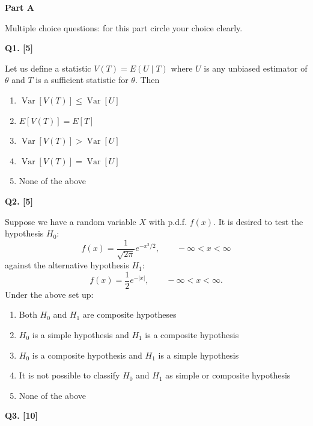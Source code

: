 \documentclass[11pt]{article}
\begin{document}
\vspace{1em}

\begin{center}
\textbf{Part A}
\end{center}

\begingroup
\small
\setlength{\parskip}{0.1em}
Multiple choice questions: for this part circle your choice clearly.

\medskip
\textbf{Q1. [5]}

Let us define a statistic $V(T)=E(U\mid T)$ where $U$ is any unbiased estimator of $\theta$ and $T$ is a sufficient statistic for $\theta$. Then
\begin{enumerate}
\setlength{\itemsep}{0pt}\setlength{\parsep}{0pt}\setlength{\topsep}{2pt}
\item[(a)] $\operatorname{Var}[V(T)]\leq\operatorname{Var}[U]$
\item[(b)] $E[V(T)]=E[T]$
\item[(c)] $\operatorname{Var}[V(T)]>\operatorname{Var}[U]$
\item[(d)] $\operatorname{Var}[V(T)]=\operatorname{Var}[U]$
\item[(e)] None of the above
\end{enumerate}

\medskip
\textbf{Q2. [5]}

Suppose we have a random variable $X$ with p.d.f. $f(x)$. It is desired to test the hypothesis $H_0$:
\[
f(x)=\frac{1}{\sqrt{2\pi}}e^{-x^2/2},\qquad -\infty<x<\infty
\]
against the alternative hypothesis $H_1$:
\[
f(x)=\frac{1}{2}e^{-|x|},\qquad -\infty<x<\infty.
\]
Under the above set up:
\begin{enumerate}
\setlength{\itemsep}{0pt}\setlength{\parsep}{0pt}\setlength{\topsep}{2pt}
\item[(a)] Both $H_0$ and $H_1$ are composite hypotheses
\item[(b)] $H_0$ is a simple hypothesis and $H_1$ is a composite hypothesis
\item[(c)] $H_0$ is a composite hypothesis and $H_1$ is a simple hypothesis
\item[(d)] It is not possible to classify $H_0$ and $H_1$ as simple or composite hypothesis
\item[(e)] None of the above
\end{enumerate}

\medskip
\textbf{Q3. [10]}
\end{document}
